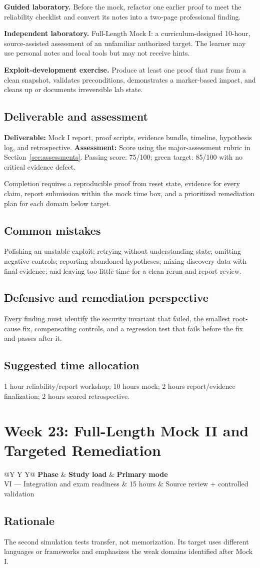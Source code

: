 \documentclass[11pt]{article}
\makeatletter
\newcommand{\weekheader}[4]{%
  \clearpage
  \section{Week #1: #2}
  \begin{tcolorbox}[colback=Navy,colframe=Navy,coltext=white]
    \begin{tabularx}{\linewidth}{@{}Y Y Y@{}}
      \textbf{Phase} & \textbf{Study load} & \textbf{Primary mode}\\
      #3 & #4 hours & Source review + controlled validation
    \end{tabularx}
  \end{tcolorbox}
}
\newcommand{\weekfield}[2]{%
  \Needspace{5\baselineskip}
  \subsection*{#1}
  #2
}
\newcommand{\deliverable}[1]{\textbf{Deliverable:} #1}
\newcommand{\assessment}[1]{\textbf{Assessment:} #1}
\makeatother
\begin{document}
\begin{labbox}
\textbf{Guided laboratory.} Before the mock, refactor one earlier proof to meet the
reliability checklist and convert its notes into a two-page professional finding.

\textbf{Independent laboratory.} Full-Length Mock I: a curriculum-designed
10-hour, source-assisted assessment of an unfamiliar authorized target. The
learner may use personal notes and local tools but may not receive hints.

\textbf{Exploit-development exercise.} Produce at least one proof that runs from a
clean snapshot, validates preconditions, demonstrates a marker-based impact, and
cleans up or documents irreversible lab state.
\end{labbox}

\weekfield{Deliverable and assessment}{\deliverable{Mock I report, proof scripts,
evidence bundle, timeline, hypothesis log, and retrospective.}
\assessment{Score using the major-assessment rubric in Section~\ref{sec:assessments}.
Passing score: 75/100; green target: 85/100 with no critical evidence defect.}}

\begin{checkpoints}
Completion requires a reproducible proof from reset state, evidence for every
claim, report submission within the mock time box, and a prioritized remediation
plan for each domain below target.
\end{checkpoints}

\weekfield{Common mistakes}{Polishing an unstable exploit; retrying without
understanding state; omitting negative controls; reporting abandoned hypotheses;
mixing discovery data with final evidence; and leaving too little time for a
clean rerun and report review.}

\weekfield{Defensive and remediation perspective}{Every finding must identify the
security invariant that failed, the smallest root-cause fix, compensating controls,
and a regression test that fails before the fix and passes after it.}

\weekfield{Suggested time allocation}{1 hour reliability/report workshop; 10
hours mock; 2 hours report/evidence finalization; 2 hours scored retrospective.}

\weekheader{23}{Full-Length Mock II and Targeted Remediation}{VI --- Integration and exam readiness}{15}

\weekfield{Rationale}{The second simulation tests transfer, not memorization. Its
target uses different languages or frameworks and emphasizes the weak domains
identified after Mock I.}
\end{document}
